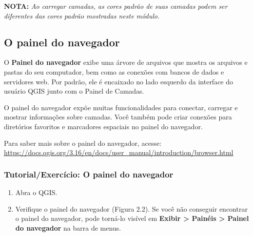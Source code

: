 \documentclass[
]{krantz}
\providecommand{\tightlist}{%
  \setlength{\itemsep}{0pt}\setlength{\parskip}{0pt}}
\begin{document}
\textbf{NOTA:} \emph{Ao carregar camadas, as cores padrão de suas camadas podem ser diferentes das cores padrão mostradas neste módulo.}

\hypertarget{o-painel-do-navegador}{%
\subsection{O painel do navegador}\label{o-painel-do-navegador}}

O \textbf{Painel do navegador} exibe uma árvore de arquivos que mostra os arquivos e pastas do seu computador, bem como as conexões com bancos de dados e servidores web. Por padrão, ele é encaixado no lado esquerdo da interface do usuário QGIS junto com o Painel de Camadas.

O painel do navegador expõe muitas funcionalidades para conectar, carregar e mostrar informações sobre camadas. Você também pode criar conexões para diretórios favoritos e marcadores espaciais no painel do navegador.

Para saber mais sobre o painel do navegador, acesse: \href{https://docs.qgis.org/3.16/en\%20/docs/user_manual/introduction/browser.html}{https://docs.qgis.org/3.16/en/docs/user\_manual/introduction/browser.html}

\hypertarget{tutorialexercuxedcio-o-painel-do-navegador}{%
\subsubsection{Tutorial/Exercício: O painel do navegador}\label{tutorialexercuxedcio-o-painel-do-navegador}}

\begin{enumerate}
\def\labelenumi{\arabic{enumi}.}
\tightlist
\item
  Abra o QGIS.
\item
  Verifique o painel do navegador (Figura 2.2). Se você não conseguir encontrar o painel do navegador, pode torná-lo visível em \textbf{Exibir \textgreater{} Painéis \textgreater{} Painel do navegador} na barra de menus.
\end{enumerate}
\end{document}
